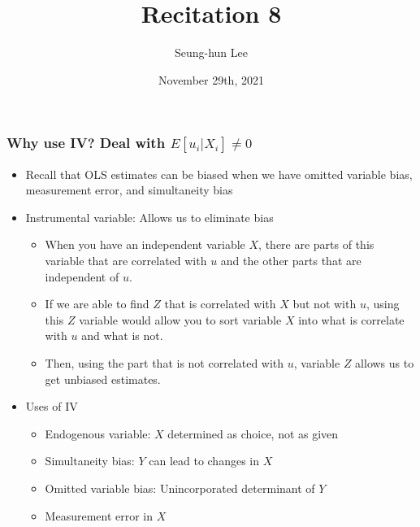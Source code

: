\documentclass[aspectratio=169]{beamer}
\title[Recitation 8]{Recitation 8} %
\author[Seung-hun Lee]{Seung-hun Lee}
\institute[Columbia University]{Columbia University}
\date[November 29th, 2021]{November 29th, 2021}
\begin{document}
\begin{frame}
\titlepage
\end{frame}

\begin{frame}
\frametitle{Why use IV? Deal with $E[u_i|X_i]\neq0$}
\begin{itemize}
\item Recall that OLS estimates can be biased when we have omitted variable bias, measurement error, and simultaneity bias
\item Instrumental variable: Allows us to eliminate bias
\begin{itemize}
\item When you have an independent variable $X$, there are parts of this variable that are correlated with $u$ and the other parts that are independent of $u$.
\item If we are able to find $Z$ that is correlated with $X$ but not with $u$, using this $Z$ variable would allow you to sort variable $X$ into what is correlate with $u$ and what is not. 
\item Then, using the part that is not correlated with $u$, variable $Z$ allows us to get unbiased estimates.
\end{itemize}
\item Uses of IV
\begin{itemize}
\item Endogenous variable: $X$ determined as choice, not as given
\item Simultaneity bias: $Y$ can lead to changes in $X$
\item Omitted variable bias: Unincorporated determinant of $Y$
\item Measurement error in $X$ 
\end{itemize}
\end{itemize}
\end{frame}
\end{document}
